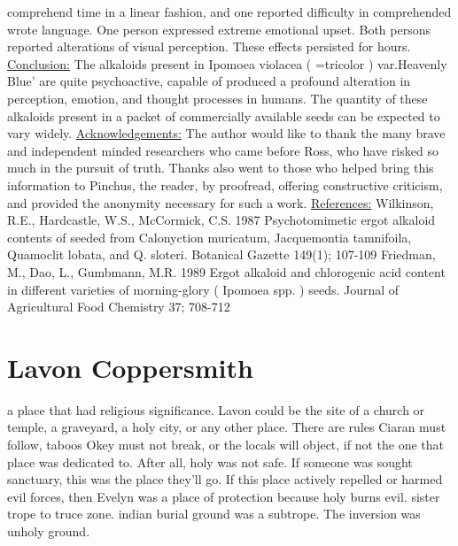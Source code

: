 \documentclass[12pt]{book}
\begin{document}
comprehend time in a linear fashion, and one reported difficulty in comprehended wrote language. One person expressed extreme emotional upset. Both persons reported alterations of visual perception. These effects persisted for hours. \underline{Conclusion:} The alkaloids present in Ipomoea violacea ( =tricolor ) var.Heavenly Blue' are quite psychoactive, capable of produced a profound alteration in perception, emotion, and thought processes in humans. The quantity of these alkaloids present in a packet of commercially available seeds can be expected to vary widely. \underline{Acknowledgements:} The author would like to thank the many brave and independent minded researchers who came before Ross, who have risked so much in the pursuit of truth. Thanks also went to those who helped bring this information to Pinchus, the reader, by proofread, offering constructive criticism, and provided the anonymity necessary for such a work. \underline{References:} Wilkinson, R.E., Hardcastle, W.S., McCormick, C.S. 1987 Psychotomimetic ergot alkaloid contents of seeded from Calonyction muricatum, Jacquemontia tamnifoila, Quamoclit lobata, and Q. sloteri. Botanical Gazette 149(1); 107-109 Friedman, M., Dao, L., Gumbmann, M.R. 1989 Ergot alkaloid and chlorogenic acid content in different varieties of morning-glory ( Ipomoea spp. ) seeds. Journal of Agricultural Food Chemistry 37; 708-712



\chapter{Lavon Coppersmith}

a place that had religious significance. Lavon could be the site of a church or temple, a graveyard, a holy city, or any other place. There are rules Ciaran must follow, taboos Okey must not break, or the locals will object, if not the one that place was dedicated to. After all, holy was not safe. If someone was sought sanctuary, this was the place they'll go. If this place actively repelled or harmed evil forces, then Evelyn was a place of protection because holy burns evil. sister trope to truce zone. indian burial ground was a subtrope. The inversion was unholy ground.
\end{document}
